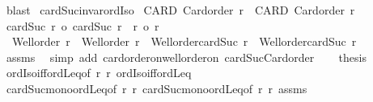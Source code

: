 \begin{isabellebody}
\ blast%
\endisatagproof
{\isafoldproof}%
%
\isadelimproof
\isanewline
%
\endisadelimproof
\isanewline
{}\isamarkupfalse%
\ cardSuc{\isacharunderscore}{\kern0pt}invar{\isacharunderscore}{\kern0pt}ordIso{\isacharcolon}{\kern0pt}\isanewline
{}\ CARD{\isacharcolon}{\kern0pt}\ {\isachardoublequoteopen}Card{\isacharunderscore}{\kern0pt}order\ r{\isachardoublequoteclose}\ \ CARD{\isacharprime}{\kern0pt}{\isacharcolon}{\kern0pt}\ {\isachardoublequoteopen}Card{\isacharunderscore}{\kern0pt}order\ r{\isacharprime}{\kern0pt}{\isachardoublequoteclose}\isanewline
{}\ {\isachardoublequoteopen}{\isacharparenleft}{\kern0pt}cardSuc\ r\ {\isacharequal}{\kern0pt}o\ cardSuc\ r{\isacharprime}{\kern0pt}{\isacharparenright}{\kern0pt}\ {\isacharequal}{\kern0pt}\ {\isacharparenleft}{\kern0pt}r\ {\isacharequal}{\kern0pt}o\ r{\isacharprime}{\kern0pt}{\isacharparenright}{\kern0pt}{\isachardoublequoteclose}\isanewline
%
\isadelimproof
%
\endisadelimproof
%
\isatagproof
{}\isamarkupfalse%
{\isacharminus}{\kern0pt}\isanewline
\ \ \isamarkupfalse%
\ {}{\isacharcolon}{\kern0pt}\ {\isachardoublequoteopen}Well{\isacharunderscore}{\kern0pt}order\ r\ {\isasymand}\ Well{\isacharunderscore}{\kern0pt}order\ r{\isacharprime}{\kern0pt}\ {\isasymand}\ Well{\isacharunderscore}{\kern0pt}order{\isacharparenleft}{\kern0pt}cardSuc\ r{\isacharparenright}{\kern0pt}\ {\isasymand}\ Well{\isacharunderscore}{\kern0pt}order{\isacharparenleft}{\kern0pt}cardSuc\ r{\isacharprime}{\kern0pt}{\isacharparenright}{\kern0pt}{\isachardoublequoteclose}\isanewline
\ \ \isamarkupfalse%
\ assms\ \isamarkupfalse%
\ {\isacharparenleft}{\kern0pt}simp\ add{\isacharcolon}{\kern0pt}\ card{\isacharunderscore}{\kern0pt}order{\isacharunderscore}{\kern0pt}on{\isacharunderscore}{\kern0pt}well{\isacharunderscore}{\kern0pt}order{\isacharunderscore}{\kern0pt}on\ cardSuc{\isacharunderscore}{\kern0pt}Card{\isacharunderscore}{\kern0pt}order{\isacharparenright}{\kern0pt}\isanewline
\ \ \isamarkupfalse%
\ {\isacharquery}{\kern0pt}thesis\isanewline
\ \ \isamarkupfalse%
\ ordIso{\isacharunderscore}{\kern0pt}iff{\isacharunderscore}{\kern0pt}ordLeq{\isacharbrackleft}{\kern0pt}of\ r\ r{\isacharprime}{\kern0pt}{\isacharbrackright}{\kern0pt}\ ordIso{\isacharunderscore}{\kern0pt}iff{\isacharunderscore}{\kern0pt}ordLeq\isanewline
\ \ \isamarkupfalse%
\ cardSuc{\isacharunderscore}{\kern0pt}mono{\isacharunderscore}{\kern0pt}ordLeq{\isacharbrackleft}{\kern0pt}of\ r\ r{\isacharprime}{\kern0pt}{\isacharbrackright}{\kern0pt}\ cardSuc{\isacharunderscore}{\kern0pt}mono{\isacharunderscore}{\kern0pt}ordLeq{\isacharbrackleft}{\kern0pt}of\ r{\isacharprime}{\kern0pt}\ r{\isacharbrackright}{\kern0pt}\ assms\ \isamarkupfalse%

\end{isabellebody}
